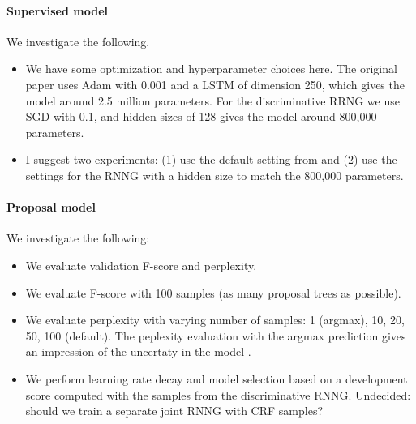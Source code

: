 \paragraph{Supervised model} We investigate the following.
\begin{itemize}
  \item We have some optimization and hyperparameter choices here. The original paper uses Adam with 0.001 and a LSTM of dimension 250, which gives the model around 2.5 million parameters. For the discriminative RRNG we use SGD with 0.1, and hidden sizes of 128 gives the model around 800,000 parameters.
  \item I suggest two experiments: (1) use the default setting from \citep{stern2017minimal} and (2) use the settings for the RNNG with a hidden size to match the 800,000 parameters.
\end{itemize}

\paragraph{Proposal model} We investigate the following:
\begin{itemize}
  \item We evaluate validation F-score and perplexity.
  \item We evaluate F-score with 100 samples (as many proposal trees as possible).
  \item We evaluate perplexity with varying number of samples: 1 (argmax), 10, 20, 50, 100 (default). The peplexity evaluation with the argmax prediction gives an impression of the uncertaty in the model \citep{buys2018exact}.
  \item  We perform learning rate decay and model selection based on a development score computed with the samples from the discriminative RNNG. Undecided: should we train a separate joint RNNG with CRF samples?
\end{itemize}

